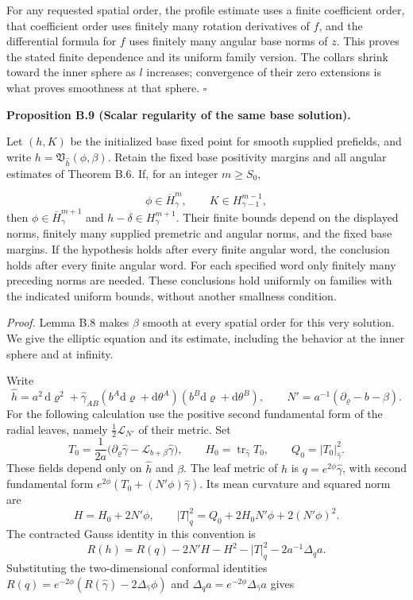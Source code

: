 \documentclass[
  english,
  11pt,
  reqno]{amsart}
\makeatletter
\newcommand{\pandocstatementheading}[1]{%
  \par\addpenalty{\@beginparpenalty}%
  \addvspace{.5\baselineskip plus .2\baselineskip minus .2\baselineskip}%
  {\normalfont\bfseries #1\par}%
  \nobreak\@afterindenttrue\@afterheading
}
\makeatother
\begin{document}
For any requested spatial order, the profile estimate uses a finite
coefficient order, that coefficient order uses finitely many rotation
derivatives of \(f\), and the differential formula for \(f\) uses
finitely many angular base norms of \(z\). This proves the stated finite
dependence and its uniform family version. The collars shrink toward the
inner sphere as \(l\) increases; convergence of their zero extensions is
what proves smoothness at that sphere. \hfill\(\square\)

\pandocstatementheading{\leavevmode{}\label{prop:online-extension-scalar-one-derivative-gain}Proposition B.9 (Scalar regularity of the same base solution).}

Let \((h,K)\) be the initialized base fixed point for smooth supplied
prefields, and write \(h=\mathfrak V_{\widehat h}(\phi,\beta)\). Retain
the fixed base positivity margins and all angular estimates of Theorem
B.6. If, for an integer \(m\ge S_0\),

\label{eq:online-extension-scalar-induction-hypothesis}
\[
\phi\in\overline H^m_\gamma,
\qquad K\in H^{m-1}_{\gamma-1},
\] then \(\phi\in\overline H^{m+1}_\gamma\) and
\(h-\delta\in H^{m+1}_\gamma\). Their finite bounds depend on the
displayed norms, finitely many supplied premetric and angular norms, and
the fixed base margins. If the hypothesis holds after every finite
angular word, the conclusion holds after every finite angular word. For
each specified word only finitely many preceding norms are needed. These
conclusions hold uniformly on families with the indicated uniform
bounds, without another smallness condition.

\emph{Proof.} Lemma B.8 makes \(\beta\) smooth at every spatial order
for this very solution. We give the elliptic equation and its estimate,
including the behavior at the inner sphere and at infinity.

Write \[
\widehat h=a^2\,\mathrm d\varrho^2+
\widehat\gamma_{AB}
(b^A\mathrm d\varrho+\mathrm d\theta^A)
(b^B\mathrm d\varrho+\mathrm d\theta^B),
\qquad
N'=a^{-1}(\partial_\varrho-b-\beta).
\] For the following calculation use the positive second fundamental
form of the radial leaves, namely \(\tfrac12\mathcal L_{N'}\) of their
metric. Set \[
T_0=\frac1{2a}
\bigl(\partial_\varrho\widehat\gamma
-\mathcal L_{b+\beta}\widehat\gamma\bigr),
\qquad H_0=\operatorname{tr}_{\widehat\gamma}T_0,
\qquad Q_0=|T_0|_{\widehat\gamma}^2.
\] These fields depend only on \(\widehat h\) and \(\beta\). The leaf
metric of \(h\) is \(q=e^{2\phi}\widehat\gamma\), with second
fundamental form \(e^{2\phi}(T_0+(N'\phi)\widehat\gamma)\). Its mean
curvature and squared norm are \[
H=H_0+2N'\phi,
\qquad
|T|_q^2=Q_0+2H_0N'\phi+2(N'\phi)^2.
\] The contracted Gauss identity in this convention is \[
R(h)=R(q)-2N'H-H^2-|T|_q^2-2a^{-1}\Delta_q a.
\] Substituting the two-dimensional conformal identities
\(R(q)=e^{-2\phi}(R(\widehat\gamma)-2\Delta_{\widehat\gamma}\phi)\) and
\(\Delta_q a=e^{-2\phi}\Delta_{\widehat\gamma}a\) gives
\end{document}
